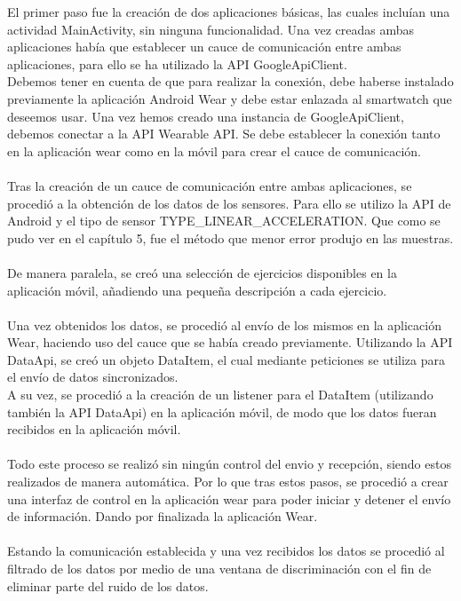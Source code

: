 El primer paso fue la creación de dos aplicaciones básicas, las cuales incluían una actividad MainActivity, sin ninguna funcionalidad. Una vez creadas ambas aplicaciones había que establecer un cauce de comunicación entre ambas aplicaciones, para ello se ha utilizado la API GoogleApiClient.
\\
Debemos tener en cuenta de que para realizar la conexión, debe haberse instalado previamente la aplicación Android Wear y debe estar enlazada al smartwatch que deseemos usar. Una vez hemos creado una instancia de GoogleApiClient, debemos conectar a la API Wearable API. Se debe establecer la conexión tanto en la aplicación wear como en la móvil para crear el cauce de comunicación.
\\
\\
Tras la creación de un cauce de comunicación entre ambas aplicaciones, se procedió a la obtención de los datos de los sensores. Para ello se utilizo la API de Android y el tipo de sensor TYPE\_LINEAR\_ACCELERATION. Que como se pudo ver en el capítulo 5, fue el método que menor error produjo en las muestras.
\\
\\
De manera paralela, se creó una selección de ejercicios disponibles en la aplicación móvil, añadiendo una pequeña descripción a cada ejercicio.
\\
\\
Una vez obtenidos los datos, se procedió al envío de los mismos en la aplicación Wear, haciendo uso del cauce que se había creado previamente. Utilizando la API DataApi, se creó un objeto DataItem, el cual mediante peticiones se utiliza para el envío de datos sincronizados.\\
A su vez, se procedió a la creación de un listener para el DataItem (utilizando también la API DataApi) en la aplicación móvil, de modo que los datos fueran recibidos en la aplicación móvil.
\\
\\
Todo este proceso se realizó sin ningún control del envio y recepción, siendo estos realizados de manera automática. Por lo que tras estos pasos, se procedió a crear una interfaz de control en la aplicación wear para poder iniciar y detener el envío de información. Dando por finalizada la aplicación Wear.
\\
\\
Estando la comunicación establecida y una vez recibidos los datos se procedió al filtrado de los datos por medio de una ventana de discriminación con el fin de eliminar parte del ruido de los datos.
